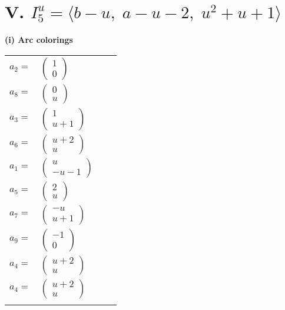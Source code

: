 \documentclass[1p]{elsarticle_modified}
\theoremstyle{definition}
\begin{document}
\centering \section*{V. $I^u_{5}= \langle b- u,\;a- u-2,\;u^2+u+1 \rangle$}
\flushleft \textbf{(i) Arc colorings}\\
\begin{tabular}{m{7pt} m{180pt} m{7pt} m{180pt} }
\flushright $a_{2}=$&$\begin{pmatrix}1\\0\end{pmatrix}$ \\
\flushright $a_{8}=$&$\begin{pmatrix}0\\u\end{pmatrix}$ \\
\flushright $a_{3}=$&$\begin{pmatrix}1\\u+1\end{pmatrix}$ \\
\flushright $a_{6}=$&$\begin{pmatrix}u+2\\u\end{pmatrix}$ \\
\flushright $a_{1}=$&$\begin{pmatrix}u\\- u-1\end{pmatrix}$ \\
\flushright $a_{5}=$&$\begin{pmatrix}2\\u\end{pmatrix}$ \\
\flushright $a_{7}=$&$\begin{pmatrix}- u\\u+1\end{pmatrix}$ \\
\flushright $a_{9}=$&$\begin{pmatrix}-1\\0\end{pmatrix}$ \\
\flushright $a_{4}=$&$\begin{pmatrix}u+2\\u\end{pmatrix}$\\ \flushright $a_{4}=$&$\begin{pmatrix}u+2\\u\end{pmatrix}$\\&\end{tabular}
\end{document}
